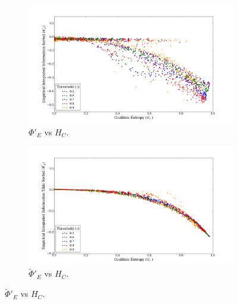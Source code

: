 \documentclass[a4paper,11pt]{article}
\begin{document}
\begin{figure}[H] 
	\label{fig:phi-vs-hc-sorted} 
	\begin{minipage}[b]{0.5\linewidth}
		\begin{figure}[H]
		\begin{center}
		\includegraphics[scale = 0.2]{figures/phi_sorted_vs_hc}
		\caption{
			$\Phi'_E$ vs $H_C$.
			\label{fig:phi_sorted_vs_hc}
		}
		\end{center}
		\end{figure}
		\vspace{2ex}
	\end{minipage}
	\begin{minipage}[b]{0.5\linewidth}
		\begin{figure}[H]
		\begin{center}
		\includegraphics[scale = 0.2]{figures/phi_tilde_sorted_vs_hc}
		\caption{
			$\widetilde{\Phi}'_E$ vs $H_C$.
			\label{fig:phi_tilde_sorted_vs_hc}
		}
		\end{center}
		\end{figure}
		\vspace{2ex}
	\end{minipage}
\end{figure}
\end{document}
